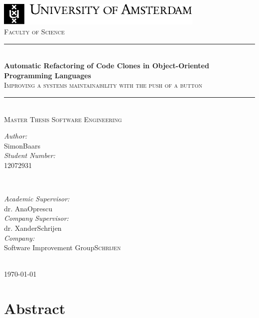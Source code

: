\documentclass{report}
\title{\thesistitle}
\author{\thesisauthorfirst\space\thesisauthorsecond}
\date{\thesisdate}
\def\thesistitle{Automatic Refactoring of Code Clones in Object-Oriented Programming Languages}
\def\thesissubtitle{Improving a systems maintainability with the push of a button}
\def\thesisauthorfirst{Simon}
\def\thesisauthorsecond{Baars}
\def\thesissupervisorfirst{dr. Ana}
\def\thesissupervisorsecond{Oprescu}
\def\thesissecondreaderfirst{dr. Xander}
\def\thesissecondreadersecond{Schrijen}
\def\thesisdate{\today}
\theoremstyle{definition}
\theoremstyle{remark}
\begin{document}
\begin{titlepage}
	\thispagestyle{empty}
	\newcommand{\HRule}{\rule{\linewidth}{0.5mm}}
	\center
	\includegraphics[width=100mm]{img/logoUvA_en.pdf}\\[.5cm]
	\textsc{Faculty of Science}\\[0.5cm]

	\HRule \\[0.4cm]
	{ \huge \bfseries \thesistitle}\\[0.1cm]
	\textsc{\thesissubtitle}\\
	\HRule \\[.5cm]
	\textsc{\large Master Thesis Software Engineering}\\[2cm]

	\begin{minipage}{0.4\textwidth}
	\begin{flushleft} \large
	\emph{Author:}\\
	\thesisauthorfirst\space \thesisauthorsecond \\[1em]
	\emph{Student Number:}\\
	12072931 \\[1em]
	\end{flushleft}
	\end{minipage}
	~
	\begin{minipage}{0.4\textwidth}
	\begin{flushright} \large
	\emph{Academic Supervisor:} \\
	\thesissupervisorfirst\space \thesissupervisorsecond \\[1em]
	\emph{Company Supervisor:} \\
	\thesissecondreaderfirst\space \thesissecondreadersecond \\[1em]
	\emph{Company:} \\
	Software Improvement Group\space \textsc{\thesissecondreadersecond}
	\end{flushright}
	\end{minipage}\\[4cm]
	\vfill
	{\large \thesisdate}\\
	\clearpage
\end{titlepage}

\tableofcontents

\newpage
\chapter{Abstract}
\end{document}
